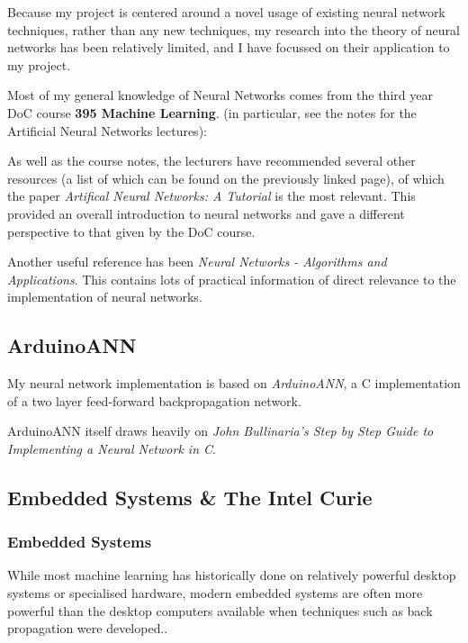 \documentclass[a4paper]{article}
\begin{document}
Because my project is centered around a novel usage of existing neural network techniques, rather than any new techniques, my research into the theory of neural networks has been relatively limited, and I have focussed on their application to my project.

Most of my general knowledge of Neural Networks comes from the third year DoC course \textbf{395 Machine Learning}\cite{bgref0}. (in particular, see the notes for the Artificial Neural Networks lectures):

As well as the course notes, the lecturers have recommended several other resources (a list of which can be found on the previously linked page), of which the paper \textit{Artifical Neural Networks: A Tutorial}\cite{bgref1} is the most relevant. This provided an overall introduction to neural networks and gave a different perspective to that given by the DoC course.

Another useful reference has been \textit{Neural Networks - Algorithms and Applications}\cite{bgref2}. This contains lots of practical information of direct relevance to the implementation of neural networks.

\subsection{ArduinoANN}%

My neural network implementation is based on \textit{ArduinoANN}\cite{bgref3}, a C implementation of a two layer feed-forward backpropagation network. 

ArduinoANN itself draws heavily on \textit{John Bullinaria's Step by Step Guide to Implementing a Neural Network in C}\cite{bgref4}.

\subsection{Embedded Systems \& The Intel Curie}%

\subsubsection{Embedded Systems}

While most machine learning has historically done on relatively powerful desktop systems or specialised hardware, modern embedded systems are often more powerful than the desktop computers available when techniques such as back propagation were developed.\cite{bgref5}. 
\end{document}
